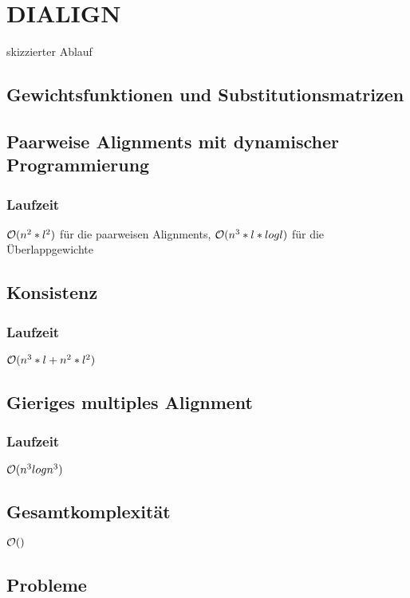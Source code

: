 \chapter{DIALIGN}
\label{ch:DIALIGN}
skizzierter Ablauf

\section{Gewichtsfunktionen und Substitutionsmatrizen}

\section{Paarweise Alignments mit dynamischer Programmierung}

\subsection{Laufzeit}
$\mathcal{O}(n^2*l^2)$ für die paarweisen Alignments, $\mathcal{O}(n^3*l*log l)$ für die Überlappgewichte

\section{Konsistenz}

\subsection{Laufzeit}
$\mathcal{O}(n^3*l + n^2*l^2)$

\section{Gieriges multiples Alignment}

\subsection{Laufzeit}
$\mathcal{O}(n^3 log n^3)$

\section{Gesamtkomplexität}
$\mathcal{O}()$

\section{Probleme}

